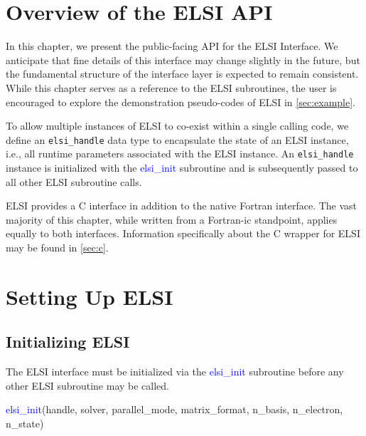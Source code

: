 \documentclass{report}
\begin{document}
\section{Overview of the ELSI API}
\label{sec:api}
In this chapter, we present the public-facing API for the ELSI Interface.  We anticipate that fine details of this interface may change slightly in the future, but the fundamental structure of the interface layer is expected to remain consistent.  While this chapter serves as a reference to the ELSI subroutines, the user is encouraged to explore the demonstration pseudo-codes of ELSI in \ref{sec:example}.

To allow multiple instances of ELSI to co-exist within a single calling code, we define an \texttt{elsi\_handle} data type to encapsulate the state of an ELSI instance, i.e., all runtime parameters associated with the ELSI instance.  An \texttt{elsi\_handle} instance is initialized with the \textcolor{blue}{elsi\_init} subroutine and is subsequently passed to all other ELSI subroutine calls.

ELSI provides a C interface in addition to the native Fortran interface.  The vast majority of this chapter, while written from a Fortran-ic standpoint, applies equally to both interfaces.  Information specifically about the C wrapper for ELSI may be found in \ref{sec:c}.

\section{Setting Up ELSI}
\label{sec:setup}
\subsection{Initializing ELSI}
\label{subsec:setup_init}
The ELSI interface must be initialized via the \textcolor{blue}{elsi\_init} subroutine before any other ELSI subroutine may be called.
\begin{labeling}{\hspace{6cm}}
\item [\hspace{0.3cm} \textcolor{blue}{elsi\_init}(handle, solver, parallel\_mode, matrix\_format, n\_basis, n\_electron, n\_state)]
\end{labeling}
\end{document}
